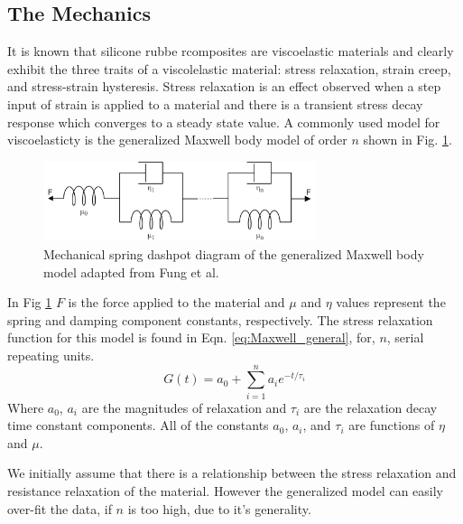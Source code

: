 \subsection{The Mechanics}
It is known that silicone rubbe rcomposites are viscoelastic materials and clearly exhibit the three traits of a viscolelastic material\cite{Fung1993}: stress relaxation, strain creep, and stress-strain hysteresis. Stress relaxation is an effect observed when a step input of strain is applied to a material and there is a transient stress decay response which converges to a steady state value. A commonly used model for viscoelasticty is the generalized Maxwell body model of order $n$ shown in Fig. \ref{fig:Maxwell_general}.
\begin{figure}[H]
	\centering
	\includegraphics[width=8cm]{Figures/Generlised_Maxwell_body.png}
	\caption{Mechanical spring dashpot diagram of the generalized Maxwell body model adapted from Fung et al.\cite{Fung1993}}
	\label{fig:Maxwell_general}
\end{figure}
In Fig \ref{fig:Maxwell_general} $F$ is the force applied to the material and $\mu$ and $\eta$ values represent the spring and damping component constants, respectively. The stress relaxation function for this model is found in Eqn. \ref{eq:Maxwell_general}, for, $n$, serial repeating units. 
\begin{equation}
	G(t) = a_0 + \sum^n_{i=1} a_i e^{-t/\tau_i}
	\label{eq:Maxwell_general} 
\end{equation}
Where $a_0$, $a_i$ are the magnitudes of relaxation and $\tau_i$ are the relaxation decay time constant components. All of the constants $a_0$, $a_i$, and $\tau_i$ are functions of $\eta$ and $\mu$. 



We initially assume that there is a relationship between the stress relaxation and resistance relaxation of the material. However the generalized model can easily over-fit the data, if $n$ is too high, due to it's generality.



